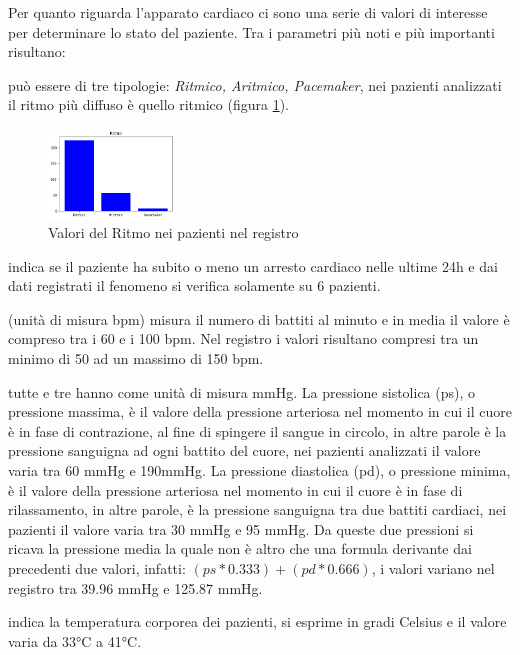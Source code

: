 Per quanto riguarda l'apparato cardiaco ci sono una serie di valori di interesse per determinare lo stato del paziente.
Tra i parametri più noti e più importanti risultano:
\begin{description}
	 \parsep
		\item [Ritmo cardiaco]	può essere di tre tipologie: \textit{Ritmico, Aritmico, Pacemaker}, nei pazienti analizzati il ritmo più diffuso è quello ritmico (figura \ref{fig:ritmo}).
	\begin{figure}[h] 
		\centering
		\includegraphics[width=0.30\textwidth]{capitolo1/ritmo.png}
		\caption{Valori del Ritmo nei pazienti nel registro}
		\label{fig:ritmo}
	\end{figure}
	\item[Arresto Cardiaco] indica se il paziente ha subito o meno un arresto cardiaco nelle ultime 24h e dai dati registrati il fenomeno si verifica solamente su 6 pazienti.
	\item[Frequenza Cadiaca](unità di misura bpm)  misura il numero di battiti al minuto e in media il valore è compreso tra i 60 e i 100 bpm. Nel registro i valori risultano compresi tra un minimo di 50 ad un massimo di 150 bpm.
	\item[Pressione Sistolica, Diastolica e Media] tutte e tre hanno come unità di misura mmHg. 
	La pressione sistolica (ps), o pressione massima,  è il valore della pressione arteriosa nel momento in cui il cuore è in fase di contrazione, al fine di spingere il sangue in circolo, in altre parole è la pressione sanguigna ad ogni battito del cuore, nei pazienti analizzati il valore varia tra 60 mmHg e 190mmHg. 
	La pressione diastolica (pd), o pressione minima, è il valore della pressione arteriosa nel momento in cui il cuore è in fase di rilassamento, in altre parole, è la pressione sanguigna tra due battiti cardiaci, nei pazienti il valore varia tra 30 mmHg e 95 mmHg.
	Da queste due pressioni si ricava la  pressione media la quale non è altro che una formula derivante dai precedenti due valori, infatti:
	$(ps * 0.333)+ (pd * 0.666)$, i valori variano nel registro tra 39.96 mmHg e 125.87 mmHg.
	\item [Temperatura] indica la temperatura corporea dei pazienti, si esprime in gradi Celsius e il  valore varia da 33°C a 41°C.
\end{description}

